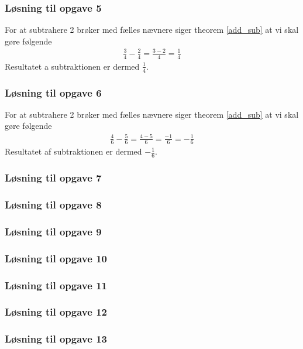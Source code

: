 \subsubsection*{Løsning til opgave 5}
For at subtrahere 2 brøker med fælles nævnere siger theorem \ref{add_sub} at vi skal gøre følgende
\begin{align*}
\frac{3}{4} - \frac{2}{4} = \frac{3 - 2}{4} = \frac{1}{4}
\end{align*}
Resultatet a subtraktionen er dermed $\frac{1}{4}$.

\subsubsection*{Løsning til opgave 6}
For at subtrahere 2 brøker med fælles nævnere siger theorem \ref{add_sub} at vi skal gøre følgende
\begin{align*}
\frac{4}{6} - \frac{5}{6} = \frac{4 - 5}{6} = \frac{-1}{6} = -\frac{1}{6}
\end{align*}
Resultatet af subtraktionen er dermed $-\frac{1}{6}$.

\subsubsection*{Løsning til opgave 7}

\subsubsection*{Løsning til opgave 8}

\subsubsection*{Løsning til opgave 9}

\subsubsection*{Løsning til opgave 10}

\subsubsection*{Løsning til opgave 11}

\subsubsection*{Løsning til opgave 12}

\subsubsection*{Løsning til opgave 13}

